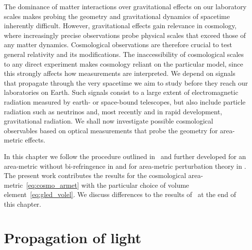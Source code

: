 The dominance of matter interactions over gravitational effects on our laboratory scales makes probing the geometry and gravitational dynamics of spacetime inherently difficult. However, gravitational effects gain relevance in cosmology, where increasingly precise observations probe physical scales that exceed those of any matter dynamics. Cosmological observations are therefore crucial to test general relativity and its modifications. The inaccessibility of cosmological scales to any direct experiment makes cosmology reliant on the particular model, since this strongly affects how measurements are interpreted. We depend on signals that propagate through the very spacetime we aim to study before they reach our laboratories on Earth. Such signals consist to a large extent of electromagnetic radiation measured by earth- or space-bound telescopes, but also include particle radiation such as neutrinos and, most recently and in rapid development, gravitational radiation. We shall now investigate possible cosmological observables based on optical measurements that probe the geometry for area-metric effects.

In this chapter we follow the procedure outlined in~\autocite{SchneiderGravlens} and further developed for an area-metric without bi-refringence in \autocite{EtheringtonNBiref} and for area-metric perturbation theory in \autocite{EtheringtonBiref}. The present work contributes the results for the cosmological area-metric~\eqref{eq:cosmo_armet} with the particular choice of volume element~\eqref{eq:gled_volel}. We discuss differences to the results of~\autocite{EtheringtonNBiref} at the end of this chapter.

\section{Propagation of light}\label{sec:prop_light}


